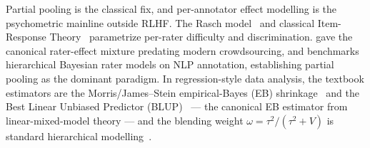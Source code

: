 \documentclass{article}
\begin{document}
Partial pooling is the classical fix, and per-annotator effect
modelling is the psychometric mainline outside RLHF. The Rasch model~\citep{rasch1960probabilistic} and classical
Item-Response Theory~\citep{baker2001basics} parametrize per-rater
difficulty and discrimination.
\citet{dawid1979maxlik} gave the canonical rater-effect mixture predating
modern crowdsourcing, and \citet{paun2018comparing} benchmarks
hierarchical Bayesian rater models on NLP annotation, establishing
partial pooling as the dominant paradigm. In regression-style data
analysis, the textbook estimators are the Morris/James--Stein
empirical-Bayes (EB) shrinkage~\citep{robbins1956empirical,morris1983parametric}
and the
Best Linear Unbiased Predictor (BLUP)~\citep{henderson1975best} ---
the canonical EB estimator from linear-mixed-model theory --- and
the blending weight $\omega = \tau^2/(\tau^2 + V)$ is standard
hierarchical modelling~\citep{gelman2007data,pinheiro2000mixed}.
\end{document}
